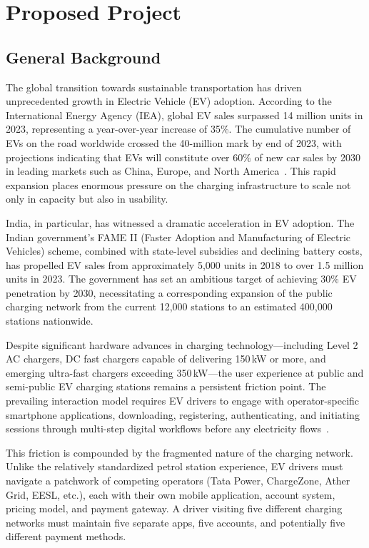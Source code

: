 \documentclass[11pt]{report}
\begin{document}
\section{Proposed Project}
\subsection{\label{gn}General Background}

The global transition towards sustainable transportation has driven unprecedented growth in Electric Vehicle (EV) adoption. According to the International Energy Agency (IEA), global EV sales surpassed 14 million units in 2023, representing a year-over-year increase of 35\%. The cumulative number of EVs on the road worldwide crossed the 40-million mark by end of 2023, with projections indicating that EVs will constitute over 60\% of new car sales by 2030 in leading markets such as China, Europe, and North America~\cite{iea2024}. This rapid expansion places enormous pressure on the charging infrastructure to scale not only in capacity but also in usability. \par

India, in particular, has witnessed a dramatic acceleration in EV adoption. The Indian government's FAME II (Faster Adoption and Manufacturing of Electric Vehicles) scheme, combined with state-level subsidies and declining battery costs, has propelled EV sales from approximately 5,000 units in 2018 to over 1.5 million units in 2023. The government has set an ambitious target of achieving 30\% EV penetration by 2030, necessitating a corresponding expansion of the public charging network from the current 12,000 stations to an estimated 400,000 stations nationwide. \par

Despite significant hardware advances in charging technology---including Level 2 AC chargers, DC fast chargers capable of delivering 150\,kW or more, and emerging ultra-fast chargers exceeding 350\,kW---the user experience at public and semi-public EV charging stations remains a persistent friction point. The prevailing interaction model requires EV drivers to engage with operator-specific smartphone applications, downloading, registering, authenticating, and initiating sessions through multi-step digital workflows before any electricity flows~\cite{hardman2018}. \par

This friction is compounded by the fragmented nature of the charging network. Unlike the relatively standardized petrol station experience, EV drivers must navigate a patchwork of competing operators (Tata Power, ChargeZone, Ather Grid, EESL, etc.), each with their own mobile application, account system, pricing model, and payment gateway. A driver visiting five different charging networks must maintain five separate apps, five accounts, and potentially five different payment methods. \par
\end{document}
